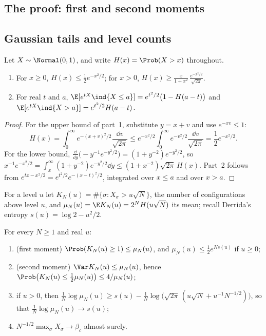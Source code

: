 \begin{refsection}
\section{The proof: first and second moments}\label{sec:rem:proof}

\subsection{Gaussian tails and level counts}\label{sec:rem:tools}

\begin{lemma}\label{lem:rem:gauss}
Let $X\sim\Normal(0,1)$, and write $H(x)=\Prob(X>x)$ throughout.
\begin{enumerate}
\item For $x\ge0$, $H(x)\le\frac12e^{-x^2/2}$; for $x>0$, $H(x)\ge\frac{x}{1+x^2}\,\frac{e^{-x^2/2}}{\sqrt{2\pi}}$.
\item For real $t$ and $a$, $\E[e^{tX}\ind\{X\le a\}]=e^{t^2/2}\bigl(1-H(a-t)\bigr)$ and $\E[e^{tX}\ind\{X>a\}]=e^{t^2/2}H(a-t)$.
\end{enumerate}
\end{lemma}

\begin{proof}
For the upper bound of part~1, substitute $y=x+v$ and use $e^{-xv}\le1$:
\[
H(x)=\int_0^\infty e^{-(x+v)^2/2}\frac{\dd v}{\sqrt{2\pi}}\le e^{-x^2/2}\int_0^\infty e^{-v^2/2}\frac{\dd v}{\sqrt{2\pi}}=\frac12e^{-x^2/2}.
\]
For the lower bound, $\frac{\dd}{\dd y}\bigl(-y^{-1}e^{-y^2/2}\bigr)=(1+y^{-2})e^{-y^2/2}$, so $x^{-1}e^{-x^2/2}=\int_x^\infty(1+y^{-2})e^{-y^2/2}\dd y\le(1+x^{-2})\sqrt{2\pi}\,H(x)$. Part~2 follows from $e^{tx-x^2/2}=e^{t^2/2}e^{-(x-t)^2/2}$, integrated over $x\le a$ and over $x>a$.
\end{proof}

For a level $u$ let $K_N(u)=\#\{\sigma:X_\sigma>u\sqrt N\}$, the number of configurations above level $u$, and $\mu_N(u)=\E K_N(u)=2^NH(u\sqrt N)$ its mean; recall Derrida's entropy $s(u)=\log2-u^2/2$.

\begin{lemma}\label{lem:rem:levels}
For every $N\ge1$ and real $u$:
\begin{enumerate}
\item (first moment) $\Prob(K_N(u)\ge1)\le\mu_N(u)$, and $\mu_N(u)\le\frac12e^{Ns(u)}$ if $u\ge0$;
\item (second moment) $\Var K_N(u)\le\mu_N(u)$, hence $\Prob\bigl(K_N(u)\le\frac12\mu_N(u)\bigr)\le4/\mu_N(u)$;
\item if $u>0$, then $\frac1N\log\mu_N(u)\ge s(u)-\frac1N\log\bigl(\sqrt{2\pi}\,(u\sqrt N+u^{-1}N^{-1/2})\bigr)$, so that $\frac1N\log\mu_N(u)\to s(u)$;
\item $N^{-1/2}\max_\sigma X_\sigma\to\beta_c$ almost surely.
\end{enumerate}
\end{lemma}


\end{refsection}
